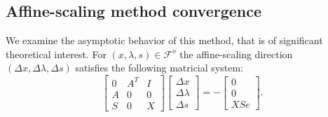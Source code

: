 \documentclass[a4paper,10 pt,titlepage,twoside]{book}
\theoremstyle{plain}
\theoremstyle{definition}
\theoremstyle{remark}
\begin{document}
\subsection*{Affine-scaling method convergence}
We examine the asymptotic behavior of this method, that is of significant theoretical interest.  For $(x, \lambda, s)\in\mathcal{F}^{o}$ the affine-scaling direction $(\Delta x, \Delta \lambda, \Delta s)$ satisfies the following matricial system:\\
\begin{equation}\label{5.1}
\begin{bmatrix}
0&A^{T}&I \\A&0&0\\S&0&X
\end{bmatrix}\begin{bmatrix}
\Delta x\\\Delta\lambda \\\Delta s
\end{bmatrix}=-\begin{bmatrix}
0\\0\\XSe
\end{bmatrix}.
\end{equation}\\
	
\end{document}
